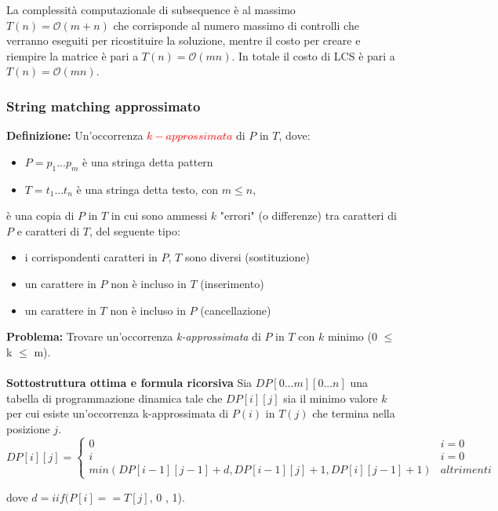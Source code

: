 \documentclass[../cheatSheetAlgoritmi.tex]{subfiles}
\begin{document}
La complessità computazionale di subsequence è al massimo $T(n) = \mathcal{O}(m+n)$ che  corrisponde al numero massimo di controlli che verranno eseguiti per ricostituire la soluzione, mentre il costo per creare e riempire la matrice è pari a $T(n) = \mathcal{O}(mn)$. In totale il costo di LCS è pari a $T(n) = \mathcal{O}(mn)$.

\subsubsection{String matching approssimato}
\textbf{Definizione:} Un'occorrenza \textcolor{red}{$k-approssimata$} di $P$ in $T$, dove: 
\begin{itemize}
	\item $P = p_{1}...p_{m}$ è una stringa detta pattern
	\item $T = t_{1}...t_{n}$ è una stringa detta testo, con $m \leq n$,
\end{itemize}
è una copia di $P$ in $T$ in cui sono ammessi $k$ "errori" (o differenze) tra caratteri di $P$ e caratteri di $T$, del seguente tipo:
\begin{itemize}
	\item i corrispondenti caratteri in $P$, $T$ sono diversi (sostituzione) 
	\item un carattere in $P$ non è incluso in $T$ (inserimento)
	\item un carattere in $T$ non è incluso in $P$ (cancellazione)
\end{itemize}
\textbf{Problema:} Trovare un'occorrenza \emph{k-approssimata} di $P$ in $T$ con $k$ minimo (0 $\leq$ k $\leq$ m).\\\\
\textbf{Sottostruttura ottima e formula ricorsiva}
Sia $DP[0...m][0...n]$ una tabella di programmazione dinamica tale che $DP[i][j]$ sia il minimo valore $k$ per cui esiste un’occorrenza k-approssimata di $P(i)$ in $T(j)$ che termina nella posizione $j$.
\begin{equation*}
  	DP[i][j] =\begin{cases}
    	0 & \text{$i = 0$}\\
    	i & \text{$i = 0$}\\
    	min(DP[i-1][j-1] + d , DP[i-1][j] + 1, DP[i][j-1] + 1)  & \text{$altrimenti$}   	
  	\end{cases}
\end{equation*}
\begin{center}
dove $d = iif(P[i] == T[j]$, 0 , 1).
\end{center}
\end{document}
